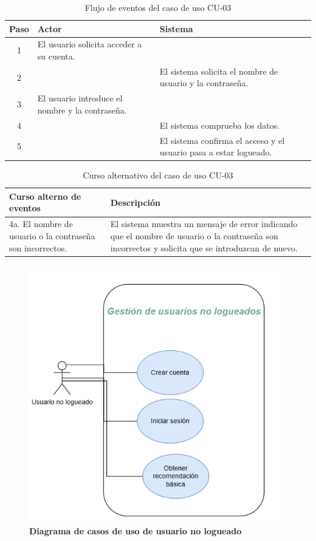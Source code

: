 \begin{table}[H]
\centering
\begin{tabular}{|c|p{5cm}|p{5cm}|}
\hline
\rowcolor{green!40} \textbf{Paso} & \textbf{Actor} & \textbf{Sistema} \\ \hline
\rowcolor{blue!10} 1 & El usuario solicita acceder a su cuenta. & \\ \hline
\rowcolor{blue!10} 2 & & El sistema solicita el nombre de usuario y la contraseña. \\ \hline
\rowcolor{blue!10} 3 & El usuario introduce el nombre y la contraseña. & \\ \hline
\rowcolor{blue!10} 4 & & El sistema comprueba los datos. \\ \hline
\rowcolor{blue!10} 5 & & El sistema confirma el acceso y el usuario pasa a estar logueado. \\ \hline
\end{tabular}
\caption{Flujo de eventos del caso de uso CU-03}
\end{table}

\begin{table}[H]
\centering
\begin{tabular}{|p{4cm}|p{8cm}|}
\hline
\rowcolor{green!40} \textbf{Curso alterno de eventos} & \textbf{Descripción} \\ \hline
\rowcolor{blue!10} 4a. El nombre de usuario o la contraseña son incorrectos. & El sistema muestra un mensaje de error indicando que el nombre de usuario o la contraseña son incorrectos y solicita que se introduzcan de nuevo. \\ \hline
\end{tabular}
\caption{Curso alternativo del caso de uso CU-03}
\end{table}


\begin{figure}[H]
    \centering
    \includegraphics[width=0.75\linewidth]{imagenes/cuU.png}
    \caption{\textbf{Diagrama de casos de uso de usuario no logueado}}
    \label{casos-de-uso-ususario-no-logueado}
\end{figure}
\newpage
